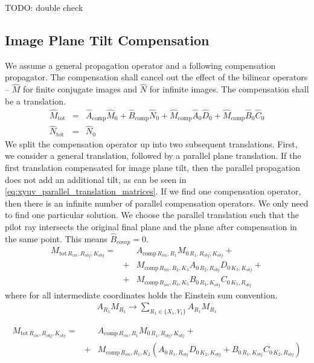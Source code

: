 \documentclass[12pt,a4paper,twoside,openright,BCOR10mm,headsepline,titlepage,abstracton,chapterprefix,final]{scrreprt}
\newcommand\tot{\textrm{tot}}
\begin{document}
TODO: double check


\subsection{Image Plane Tilt Compensation}
We assume a general propagation operator and a following compensation propagator.
The compensation shall cancel out the effect of the bilinear operators 
--
$\hat{M}$ for finite conjugate images
and $\hat{N}$ for infinite images.
The compensation shall be a translation.
\begin{eqnarray}
 \hat{M}_\tot &=& \hat{A}_{\text{comp}} \hat{M}_0 + \hat{B}_{\text{comp}} \hat{N}_0 + \hat{M}_{\text{comp}} \hat{A}_0 \hat{D}_0 + \hat{M}_{\text{comp}} \hat{B}_0 \hat{C}_0 \\
 \hat{N}_\tot &=& \hat{N}_0
\end{eqnarray}
We split the compensation operator up into two subsequent translations.
First, we consider a general translation, followed by a parallel plane translation.
If the first translation compensated for image plane tilt, then the parallel propagation does not add an additional tilt,
as can be seen in \eqref{eq:xyuv_parallel_translation_matrices}.
If we find one compensation operator, then there is an infinite number of parallel compensation operators.
We only need to find one particular solution.
We choose the parallel translation such that the pilot ray intersects the original final plane and the plane after compensation in the same point.
This means $\hat{B}_{comp} = 0$.
\begin{eqnarray}
 M_{\tot\,R_{im},R_{obj},K_{obj}} =&& A_{\text{comp}\,R_{im},R_1} M_{0\,R_1,R_{obj},K_{obj}} + \nonumber\\
                                  &+& M_{\text{comp}\,R_{im},R_2,K_3} A_{0\,R_2,R_{obj}} D_{0\,K_3,K_{obj}} + \nonumber\\
                                  &+& M_{\text{comp}\,R_{im},R_4,K_5} B_{0\,R_4,K_{obj}} C_{0\,K_5,R_{obj}}
\end{eqnarray}
where for all intermediate coordinates holds the Einstein sum convention.
\begin{eqnarray}
 A_{R_1} M_{R_1} \rightarrow \sum_{R_1 \in \{ X_1,Y_1\} } A_{R_1} M_{R_1} \nonumber
\end{eqnarray}

\begin{eqnarray}
 M_{\tot\,R_{im},R_{obj},K_{obj}} =&& A_{\text{comp}\,R_{im},R_1} M_{0\,R_1,R_{obj},K_{obj}} + \nonumber\\
                                  &+& M_{\text{comp}\,R_{im},R_1,K_2} \left( A_{0\,R_1,R_{obj}} D_{0\,K_2,K_{obj}} + B_{0\,R_1,K_{obj}} C_{0\,K_2,R_{obj}} \right)
\end{eqnarray}
\end{document}
